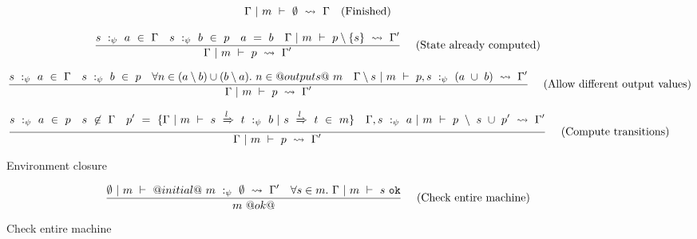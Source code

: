 \begin{figure*}

$$
\Gamma ~|~ m ~\vdash~ \emptyset ~\rightsquigarrow~ \Gamma
\quad
\textrm{(Finished)}
$$

$$
\frac {\displaystyle 
    s~:_\psi~ a ~\in~ \Gamma
    \quad
    s~:_\psi~b~\in~p
    \quad
    a~=~b
    \quad
    \Gamma ~|~ m ~\vdash~ p \setminus \{s\} ~\rightsquigarrow~ \Gamma'
} {\displaystyle 
    \Gamma ~|~ m ~\vdash~ p ~\rightsquigarrow~ \Gamma'
} \ 
\quad
\textrm{(State already computed)}
$$

$$
\frac {\displaystyle 
    s~:_\psi~ a ~\in~ \Gamma
    \quad
    s~:_\psi~b~\in~p
    \quad
    \forall n \in (a \setminus b) \cup (b \setminus a).~ n \in @outputs@~m
    \quad
    \Gamma \setminus s ~|~ m ~\vdash~ p, s~:_\psi~(a~\cup~b) ~\rightsquigarrow~ \Gamma'
} {\displaystyle 
    \Gamma ~|~ m ~\vdash~ p ~\rightsquigarrow~ \Gamma'
} \ 
\quad
\textrm{(Allow different output values)}
$$

$$
\frac {\displaystyle 
    s~:_\psi~a~\in~p
    \quad
    s~\not\in~\Gamma
    \quad
    p'~=~\{ \Gamma ~|~ m ~\vdash~ s~\xRightarrow{l}~t ~:_\psi~ b ~|~ s~\xRightarrow{l}~ t~\in~ m\}
    \quad
    \Gamma,s~:_\psi~a ~|~ m ~\vdash~ p~\setminus~s~\cup~ p'  ~\rightsquigarrow~ \Gamma'
} {\displaystyle 
    \Gamma ~|~ m ~\vdash~ p ~\rightsquigarrow~ \Gamma'
} \ 
\quad
\textrm{(Compute transitions)}
$$

\caption{Environment closure}
\label{fig:inv:closure}
\end{figure*}


\begin{figure*}

$$
\frac {\displaystyle 
    \emptyset ~|~ m ~\vdash~ @initial@~m~:_\psi~\emptyset ~\rightsquigarrow~ \Gamma'
    \quad
    \forall s \in m.\ \Gamma ~|~ m ~\vdash~ s~\mathtt{ok}
} {\displaystyle 
    m~@ok@
} \ 
\quad
\textrm{(Check entire machine)}
$$


\caption{Check entire machine}
\label{fig:inv:entire}
\end{figure*}
